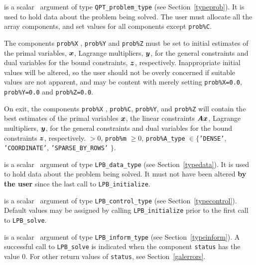 \documentclass{galahad}
\newcommand{\packagename}{LPB}
\begin{document}
\begin{description}
 is a scalar \intentinout\ argument of type
{\tt QPT\_problem\_type}
(see Section~\ref{typeprob}).
It is used to hold data about the problem being solved.
The user must allocate all the array components,
and set values for all components except {\tt prob\%C}.

The components {\tt prob\%X} , {\tt prob\%Y} and {\tt prob\%Z}
must be set to initial estimates of the primal variables, ${\bm{x}}$,
Lagrange multipliers, ${\bm{y}}$, for the general constraints
and dual variables for the bound constraints, ${\bm{z}}$, respectively.
Inappropriate initial values will be altered, so the user should
not be overly concerned if suitable values are not apparent, and may be
content with merely setting {\tt prob\%X=0.0}, {\tt prob\%Y=0.0}
and {\tt prob\%Z=0.0}.

On exit, the components {\tt prob\%X} , {\tt prob\%C}, {\tt prob\%Y},
and {\tt prob\%Z}
will contain the best estimates of the primal variables ${\bm{x}}$,
the linear constraints ${\bm{A}} {\bm{x}}$,
Lagrange multipliers, ${\bm{y}}$, for the general constraints
and dual variables for the bound constraints ${\bm{z}}$, respectively.
 $> 0$, {\tt prob\%m} $\geq 0$,
 {\tt prob\%A\_type} $\in \{${\tt 'DENSE'},
 {\tt 'COORDINATE'}, {\tt 'SPARSE\_BY\_\-ROWS'} $\}$.

 is a scalar \intentinout\ argument of type
{\tt \packagename\_data\_type}
(see Section~\ref{typedata}). It is used to hold data about the problem being
solved. It must not have been altered {\bf by the user} since the last call to
{\tt \packagename\_initialize}.

 is a scalar \intentin\ argument of type
{\tt \packagename\_control\_type}
(see Section~\ref{typecontrol}). Default values may be assigned by calling
{\tt \packagename\_initialize} prior to the first call to
{\tt \packagename\_solve}.

 is a scalar \intentinout\ argument of type
{\tt \packagename\_inform\_type}
(see Section~\ref{typeinform}).
A successful call to
{\tt \packagename\_solve}
is indicated when the  component {\tt status} has the value 0.
For other return values of {\tt status}, see Section~\ref{galerrors}.


\end{description}
\end{document}
